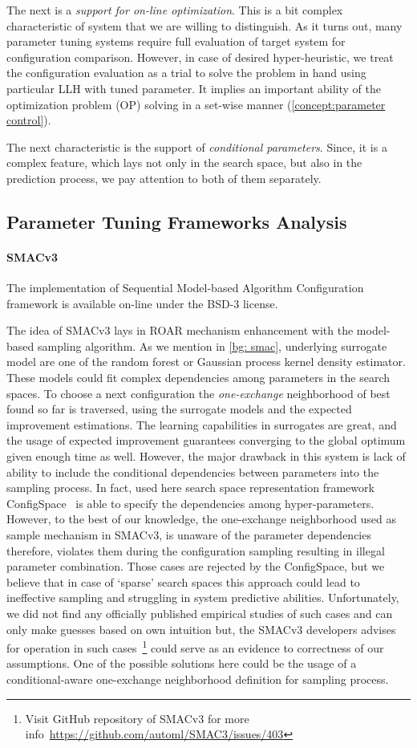 The next is a \emph{support for on-line optimization}. This is a bit complex characteristic of system that we are willing to distinguish. As it turns out, many parameter tuning systems require full evaluation of target system for configuration comparison. However, in case of desired hyper-heuristic, we treat the configuration evaluation as a trial to solve the problem in hand using particular LLH with tuned parameter. It implies an important ability of the optimization problem (OP) solving in a set-wise manner (\cref{concept:parameter control}).

The next characteristic is the support of \emph{conditional parameters}. Since, it is a complex feature, which lays not only in the search space, but also in the prediction process, we pay attention to both of them separately.

\subsection{Parameter Tuning Frameworks Analysis}\label{impl: Parameter Tuning Frameworks Analysis}
\paragraph{SMACv3}
The implementation of Sequential Model-based Algorithm Configuration framework is available on-line under the BSD-3 license.

The idea of SMACv3 lays in ROAR mechanism enhancement with the model-based sampling algorithm.
As we mention in \cref{bg: smac}, underlying surrogate model are one of the random forest or Gaussian process kernel density estimator. These models could fit complex dependencies among parameters in the search spaces. To choose a next configuration the \emph{one-exchange} neighborhood of best found so far is traversed, using the surrogate models and the expected improvement estimations.
The learning capabilities in surrogates are great, and the usage of expected improvement guarantees converging to the global optimum given enough time as well. However, the major drawback in this system is lack of ability to include the conditional dependencies between parameters into the sampling process. In fact, used here search space representation framework ConfigSpace~\cite{configspace} is able to specify the dependencies among hyper-parameters.
However, to the best of our knowledge, the one-exchange neighborhood used as sample mechanism in SMACv3, is unaware of the parameter dependencies therefore, violates them during the configuration sampling resulting in illegal parameter combination. Those cases are rejected by the ConfigSpace, but we believe that in case of `sparse' search spaces this approach could lead to ineffective sampling and struggling in system predictive abilities. Unfortunately, we did not find any officially published empirical studies of such cases and can only make guesses based on own intuition but, the SMACv3 developers advises for operation in such cases~\footnote{Visit GitHub repository of SMACv3 for more info~\url{https://github.com/automl/SMAC3/issues/403}} could serve as an evidence to correctness of our assumptions. One of the possible solutions here could be the usage of a conditional-aware one-exchange neighborhood definition for sampling process.

